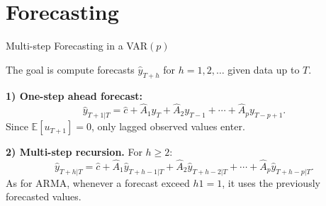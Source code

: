 \documentclass{beamer}
\begin{document}
\section{Forecasting}


\begin{frame}{Multi-step Forecasting in a VAR$(p)$}

The goal is compute forecasts $\widehat{y}_{T+h}$ for $h=1,2,\dots$ given data up to $T$.

\bigskip

\textbf{1) One-step ahead forecast:}
\[
\widehat{y}_{T+1|T} = \widehat{c}
+ \widehat{A}_1 y_T
+ \widehat{A}_2 y_{T-1}
+ \cdots
+ \widehat{A}_p y_{T-p+1}.
\]
Since $\mathbb{E}[u_{T+1}]=0$, only lagged observed values enter.

\bigskip

\textbf{2) Multi-step recursion.}
For $h\ge 2$:
\[
\widehat{y}_{T+h|T}
= \widehat{c}
+ \widehat{A}_1 \widehat{y}_{T+h-1|T}
+ \widehat{A}_2 \widehat{y}_{T+h-2|T}
+ \cdots
+ \widehat{A}_p \widehat{y}_{T+h-p|T}.
\]
As for ARMA, whenever a forecast exceed $h1=1$, it uses the previously forecasted values.

\end{frame}
\end{document}
